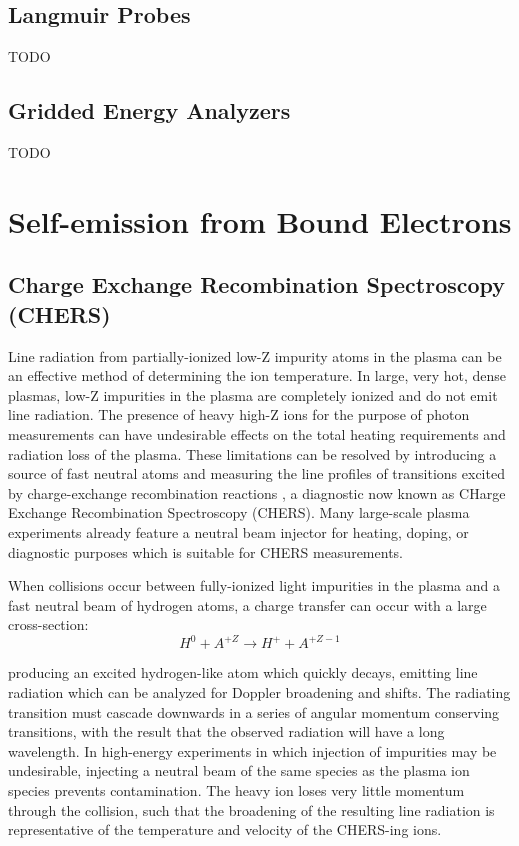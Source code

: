 \documentclass{jpp}
\begin{document}
\subsection{Langmuir Probes}

{\Large TODO \par}

\subsection{Gridded Energy Analyzers}

{\Large TODO \par}

\section{Self-emission from Bound Electrons}


\subsection{Charge Exchange Recombination Spectroscopy (CHERS)}

Line radiation from partially-ionized low-Z impurity atoms in the plasma can be an effective method of determining the ion temperature. In large, very hot, dense plasmas, low-Z impurities in the plasma are completely ionized and do not emit line radiation. The presence of heavy high-Z ions for the purpose of photon measurements can have undesirable effects on the total heating requirements and radiation loss of the plasma. These limitations can be resolved by introducing a source of fast neutral atoms and measuring the line profiles of transitions excited by charge-exchange recombination reactions \citep{doi:10.1063/1.93893}, a diagnostic now known as CHarge Exchange Recombination Spectroscopy (CHERS). Many large-scale plasma experiments already feature a neutral beam injector for heating, doping, or diagnostic purposes which is suitable for CHERS measurements.

When collisions occur between fully-ionized light impurities in the plasma and a fast neutral beam of hydrogen atoms, a charge transfer can occur with a large cross-section:
\begin{equation*}
H^0 + A^{+Z} \rightarrow H^+ + A^{+Z - 1}
\end{equation*}

producing an excited hydrogen-like atom which quickly decays, emitting line radiation which can be analyzed for Doppler broadening and shifts. The radiating transition must cascade downwards in a series of angular momentum conserving transitions, with the result that the observed radiation will have a long wavelength. In high-energy experiments in which injection of impurities may be undesirable, injecting a neutral beam of the same species as the plasma ion species prevents contamination. The heavy ion loses very little momentum through the collision, such that the broadening of the resulting line radiation is representative of the temperature and velocity of the CHERS-ing ions.
\end{document}
